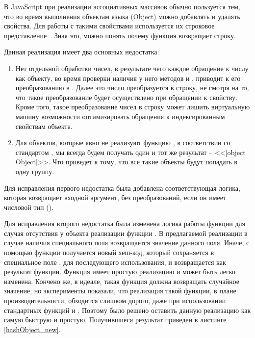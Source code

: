 В JavaScript при реализации ассоциативных массивов обычно пользуется тем, что во время выполнения объектам языка (Object) можно добавлять и удалять свойства. Для работы с такими свойствами используется их строковое представление~\cite{EffJS}. Зная это, можно понять почему функция  возвращает строку.

Данная реализация имеет два основных недостатка:
\begin{enumerate}
\item Нет отдельной обработки чисел, в результате чего каждое обращение к числу как объекту, во время проверки наличия у него методов	 и , приводит к его преобразованию в . Далее это число преобразуется в строку, не смотря на то, что такое преобразование будет осуществлено при обращении к свойству.
Кроме того, такое преобразование чисел в строку может лишить виртуальную машину возможности оптимизировать обращения к индексированным свойствам объекта.

\item Для объектов, которые явно не реализуют функцию , в соответствии со стандартом \cite{ES5}, мы всегда будем получать один и тот же результат -- <<[object Object]>>. Что приведет к тому, что все такие объекты будут попадать в одну группу.
\end{enumerate}

Для исправления первого недостатка была добавлена соответствующая логика, которая возвращает входной аргумент, без преобразований, если он имеет числовой тип ().

Для исправления второго недостатка была изменена логика работы функции для случая отсутствия у объекта реализации функции . В предлагаемой реализации в случае наличия специального поля  возвращается значение данного поля. Иначе, с помощью функции  получается новый хеш-код, который сохраняется в специальное поле , для последующего использования, и возвращается как результат функции.
Функция  имеет простую реализацию и может быть легко изменена. Кончено же, в идеале, такая функция должна возвращать случайное значение, но эксперименты показали, что реализация такой функции, в плане производительности, обходится слишком дорого, даже при использовании стандартных функций  и . Поэтому было решено оставить данную реализацию как самую быструю и простую.
Получившиеся результат приведен в листинге \ref{hashObject_new}.

